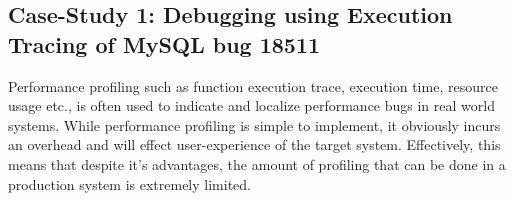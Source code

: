 


\iffalse
\subsection{Case-Study 1: Debugging using Execution Tracing of MySQL bug 18511}  
Performance profiling such as function execution trace, execution time, resource usage etc., is often used to indicate and localize performance bugs in real world systems. 
While performance profiling is simple to implement, it obviously incurs an overhead and will effect user-experience of the target system.
Effectively, this means that despite it's advantages, the amount of profiling that can be done in a production system is extremely limited. 

